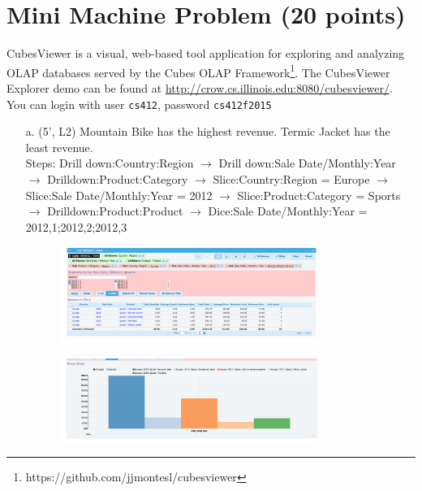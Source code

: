 \newpage


\section*{Mini Machine Problem (20 points)}
CubesViewer is a visual, web-based tool application for exploring and analyzing OLAP databases served by the Cubes OLAP Framework\footnote{https://github.com/jjmontesl/cubesviewer}. The CubesViewer Explorer demo can be found at \url{http://crow.cs.illinois.edu:8080/cubesviewer/}. You can login with user {\tt cs412}, password {\tt cs412f2015}\\
  
\begin{enumerate}
\item[a.](5', L2) 
Mountain Bike has the highest revenue. Termic Jacket has the least revenue. \\
Steps: Drill down:Country:Region $\rightarrow$ 
Drill down:Sale Date/Monthly:Year $\rightarrow$ 
Drilldown:Product:Category $\rightarrow$ 
Slice:Country:Region = Europe $\rightarrow$ 
Slice:Sale Date/Monthly:Year = 2012 $\rightarrow$
 Slice:Product:Category = Sports $\rightarrow$ 
 Drilldown:Product:Product $\rightarrow$ 
 Dice:Sale Date/Monthly:Year = 2012,1;2012,2;2012,3
\begin{figure}[H]
\includegraphics[width=0.8\textwidth]{Figures/5a.png}
\centering
\end{figure}

\begin{figure}[H]
\includegraphics[width=0.8\textwidth]{Figures/5a2.png}
\centering
\end{figure}


\end{enumerate}
